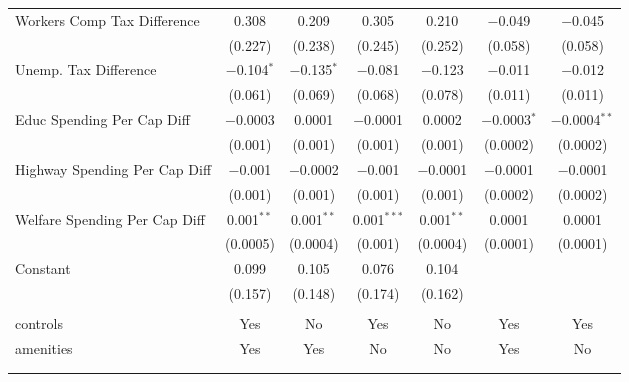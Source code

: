\begin{table}[!htbp]
\begin{tabular}{@{\extracolsep{5pt}}lcccccc}
  Workers Comp Tax Difference & 0.308 & 0.209 & 0.305 & 0.210 & $-$0.049 & $-$0.045 \\ 
  & (0.227) & (0.238) & (0.245) & (0.252) & (0.058) & (0.058) \\ 
  Unemp. Tax Difference & $-$0.104$^{*}$ & $-$0.135$^{*}$ & $-$0.081 & $-$0.123 & $-$0.011 & $-$0.012 \\ 
  & (0.061) & (0.069) & (0.068) & (0.078) & (0.011) & (0.011) \\ 
  Educ Spending Per Cap Diff & $-$0.0003 & 0.0001 & $-$0.0001 & 0.0002 & $-$0.0003$^{*}$ & $-$0.0004$^{**}$ \\ 
  & (0.001) & (0.001) & (0.001) & (0.001) & (0.0002) & (0.0002) \\ 
  Highway Spending Per Cap Diff & $-$0.001 & $-$0.0002 & $-$0.001 & $-$0.0001 & $-$0.0001 & $-$0.0001 \\ 
  & (0.001) & (0.001) & (0.001) & (0.001) & (0.0002) & (0.0002) \\ 
  Welfare Spending Per Cap Diff & 0.001$^{**}$ & 0.001$^{**}$ & 0.001$^{***}$ & 0.001$^{**}$ & 0.0001 & 0.0001 \\ 
  & (0.0005) & (0.0004) & (0.001) & (0.0004) & (0.0001) & (0.0001) \\ 
  Constant & 0.099 & 0.105 & 0.076 & 0.104 &  &  \\ 
  & (0.157) & (0.148) & (0.174) & (0.162) &  &  \\ 
 \hline \\[-1.8ex] 
controls & Yes & No & Yes & No & Yes & Yes \\ 
amenities & Yes & Yes & No & No & Yes & No \\ 
\hline \\[-1.8ex] 
\hline 
\hline \\[-1.8ex] 
\end{tabular} 
\end{table} 

